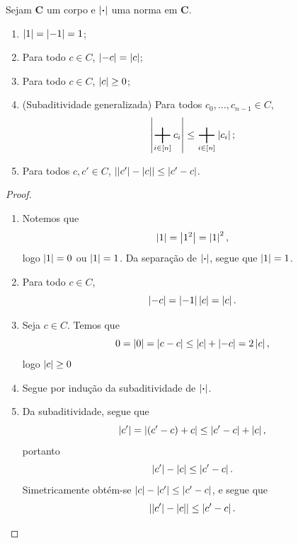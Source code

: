 \begin{prop}
Sejam $\bm C$ um corpo e $\abs{\var}$ uma norma em $\bm C$.
	\begin{enumerate}
	\item $\abs{1}=\abs{-1}=1$;
	\item Para todo $c \in C$, $\abs{-c}=\abs{c}$;
	\item Para todo $c \in C$, $\abs{c} \geq 0$;
	\item (Subaditividade generalizada) Para todos $c_0,\dots,c_{n-1} \in C$,
		\begin{equation*}
		\abs{\sum_{i \in [n]} c_i} \leq \sum_{i \in [n]} \abs{c_i};
		\end{equation*}
	\item Para todos $c,c' \in C$, $\abs{\abs{c'}-\abs{c}} \leq \abs{c'-c}$.		
	\end{enumerate}
\end{prop}
\begin{proof}
	\begin{enumerate}
	\item Notemos que
		\begin{equation*}
		\abs{1} = \abs{1^2} = \abs{1}^2,
		\end{equation*}
logo $\abs{1}=0$ ou $\abs{1}=1$. Da separação de $\abs{\var}$, segue que $\abs{1}=1$.

	\item Para todo $c \in C$,
		\begin{equation*}
		\abs{-c} = \abs{-1}\abs{c}=\abs{c}.
		\end{equation*}
	
	\item Seja $c \in C$. Temos que
		\begin{equation*}
		0 = \abs{0} = \abs{c-c} \leq \abs{c} + \abs{-c} = 2 \abs{c},
		\end{equation*}
logo $\abs{c} \geq 0$
	
	\item Segue por indução da subaditividade de $\abs{\var}$.
	
		\item Da subaditividade, segue que
		\begin{equation*}
		\abs{c'} = \abs{(c'-c)+c} \leq \abs{c'-c} + \abs{c},
		\end{equation*}
portanto
		\begin{equation*}
		\abs{c'}-\abs{c} \leq \abs{c'-c}.
		\end{equation*}
Simetricamente obtém-se $\abs{c}-\abs{c'} \leq \abs{c'-c}$, e segue que
		\begin{equation*}
		\abs{\abs{c'}-\abs{c}} \leq \abs{c'-c}.
		\end{equation*}
	\end{enumerate}
\end{proof}

